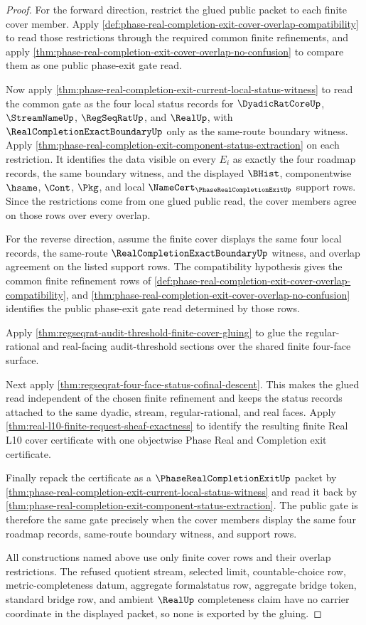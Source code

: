 \begin{proof}
For the forward direction, restrict the glued public packet to each finite cover member. Apply \autoref{def:phase-real-completion-exit-cover-overlap-compatibility} to read those restrictions through the required common finite refinements, and apply \autoref{thm:phase-real-completion-exit-cover-overlap-no-confusion} to compare them as one public phase-exit gate read.

Now apply \autoref{thm:phase-real-completion-exit-current-local-status-witness} to read the common gate as the four local status records for $\DyadicRatCoreUp$, $\StreamNameUp$, $\RegSeqRatUp$, and $\RealUp$, with $\RealCompletionExactBoundaryUp$ only as the same-route boundary witness. Apply \autoref{thm:phase-real-completion-exit-component-status-extraction} on each restriction. It identifies the data visible on every $E_i$ as exactly the four roadmap records, the same boundary witness, and the displayed $\BHist$, componentwise $\hsame$, $\Cont$, $\Pkg$, and local $\NameCert_{\PhaseRealCompletionExitUp}$ support rows. Since the restrictions come from one glued public read, the cover members agree on those rows over every overlap.

For the reverse direction, assume the finite cover displays the same four local records, the same-route $\RealCompletionExactBoundaryUp$ witness, and overlap agreement on the listed support rows. The compatibility hypothesis gives the common finite refinement rows of \autoref{def:phase-real-completion-exit-cover-overlap-compatibility}, and \autoref{thm:phase-real-completion-exit-cover-overlap-no-confusion} identifies the public phase-exit gate read determined by those rows.

Apply \autoref{thm:regseqrat-audit-threshold-finite-cover-gluing} to glue the regular-rational and real-facing audit-threshold sections over the shared finite four-face surface.

Next apply \autoref{thm:regseqrat-four-face-status-cofinal-descent}. This makes the glued read independent of the chosen finite refinement and keeps the status records attached to the same dyadic, stream, regular-rational, and real faces. Apply \autoref{thm:real-l10-finite-request-sheaf-exactness} to identify the resulting finite Real L10 cover certificate with one objectwise Phase Real and Completion exit certificate.

Finally repack the certificate as a $\PhaseRealCompletionExitUp$ packet by \autoref{thm:phase-real-completion-exit-current-local-status-witness} and read it back by \autoref{thm:phase-real-completion-exit-component-status-extraction}. The public gate is therefore the same gate precisely when the cover members display the same four roadmap records, same-route boundary witness, and support rows.

All constructions named above use only finite cover rows and their overlap restrictions. The refused quotient stream, selected limit, countable-choice row, metric-completeness datum, aggregate formalstatus row, aggregate bridge token, standard bridge row, and ambient $\RealUp$ completeness claim have no carrier coordinate in the displayed packet, so none is exported by the gluing.
\end{proof}

